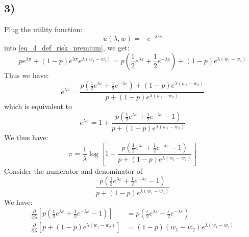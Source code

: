 \documentclass{article}
\begin{document}
	\subsection*{3)} Plug the utility function:
	\begin{equation}
		u(\lambda,w) = - e^{-\lambda\,w}
	\end{equation}
	into \eqref{eq_4_def_risk_premium}, we get:
	\begin{equation}
		p e^{\lambda \pi} + (1-p) e^{\lambda \pi} e^{\lambda (w_1 - w_2)} = p \left( \frac{1}{2} e^{\lambda \varepsilon} + \frac{1}{2} e^{-\lambda \varepsilon} \right) + (1-p) e^{\lambda(w_1 - w_2)}
	\end{equation}
	Thus we have:
	\begin{equation}
		e^{\lambda \pi} = \frac{p \left( \frac{1}{2} e^{\lambda \varepsilon} + \frac{1}{2} e^{-\lambda \varepsilon} \right) + (1-p) e^{\lambda(w_1 - w_2)}}{p + (1-p) e^{\lambda (w_1 - w_2)} }
	\end{equation}
	which is equivalent to
	\begin{equation}
		e^{\lambda \pi} = 1+ \frac{p \left( \frac{1}{2} e^{\lambda \varepsilon} + \frac{1}{2} e^{-\lambda \varepsilon} -1 \right)}{p + (1-p) e^{\lambda (w_1 - w_2)} }
	\end{equation}
	We thus have:
	\begin{equation}
		\label{eq_4_risk_premium_calculation}
		\pi = \frac{1}{\lambda} \log \left[ 1+ \frac{p \left( \frac{1}{2} e^{\lambda \varepsilon} + \frac{1}{2} e^{-\lambda \varepsilon} -1 \right)}{p + (1-p) e^{\lambda (w_1 - w_2)} } \right]
	\end{equation}
	Consider the numerator and denominator of 
	\begin{equation}
		\frac{p \left( \frac{1}{2} e^{\lambda \varepsilon} + \frac{1}{2} e^{-\lambda \varepsilon} -1 \right)}{p + (1-p) e^{\lambda (w_1 - w_2)} }
	\end{equation}
	We have:
	\begin{equation}
		\begin{aligned}
			 \frac{\partial}{\partial \lambda} \left[ p \left( \frac{1}{2} e^{\lambda \varepsilon} + \frac{1}{2} e^{-\lambda \varepsilon} -1 \right) \right] & =  p \left( \frac{\varepsilon}{2} e^{\lambda \varepsilon} - \frac{\varepsilon}{2} e^{-\lambda \varepsilon} \right) \\
			 \frac{\partial}{\partial \lambda} \left[ p + (1-p) e^{\lambda (w_1 - w_2)} \right] & = 
			 (1-p)(w_1 - w_2)e^{\lambda (w_1 - w_2)} 
		\end{aligned}
	\end{equation}
\end{document}
